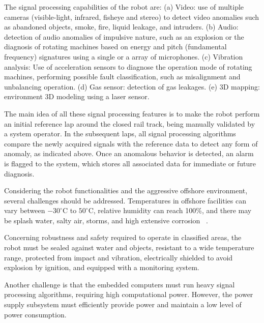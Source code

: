\documentclass{ifacconf}
\begin{document}
The signal processing capabilities of the robot are: (a) Video: use
of multiple cameras (visible-light, infrared, fisheye and stereo) to detect
video anomalies such as abandoned objects, smoke, fire, liquid leakage, and
intruders. (b) Audio: detection of audio anomalies of impulsive nature, such as
an explosion or the diagnosis of rotating machines based on energy and pitch
(fundamental frequency) signatures using a single or a array of microphones. (c)
Vibration analysis: Use of acceleration sensors to diagnose the operation mode
of rotating machines, performing possible fault classification, such as
 misalignment and unbalancing operation. (d) Gas sensor: detection of gas
 leakages. (e) 3D mapping: environment 3D modeling using a laser sensor.

The main idea of all these signal processing features is to make the robot
perform an initial reference lap around the closed rail track, being manually
validated by a system operator. In the subsequent laps, all signal processing
algorithms compare the newly acquired signals with the reference data to detect
any form of anomaly, as indicated above. Once an anomalous behavior is
detected, an alarm is flagged to the system, which stores all associated data
for immediate or future diagnosis.


Considering the robot functionalities and the aggressive offshore environment,
several challenges should be addressed. Temperatures in offshore facilities can
vary between $-30^{\circ}$C to $50^{\circ}$C, relative humidity can reach
100\%, and there may be splash water, salty air, storms, and high extensive
corrosion ~\cite{graf2007mobile}.

Concerning robustness and safety required to operate in classified areas, the
robot must be sealed against water and objects, resistant to a wide temperature
range, protected from impact and vibration, electrically shielded to avoid
explosion by ignition, and equipped with a monitoring system.


Another challenge is that the embedded computers must run heavy signal
processing algorithms, requiring high computational power. However, the power
supply subsystem must efficiently provide power and maintain a low level of
power consumption.
\end{document}
